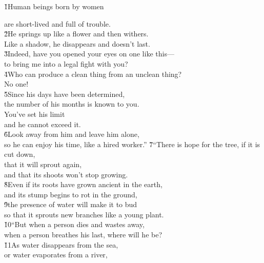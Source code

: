 \v{1}Human beings born by women

\begin{poetry}
\poemll    are short-lived and full of trouble. \\
\poeml \v{2}He springs up like a flower and then withers. \\
\poemll    Like a shadow, he disappears and doesn't last. \\
\poeml \v{3}Indeed, have you opened your eyes on one like this--- \\
\poemll    to bring me into a legal fight with you? \\
\poeml \v{4}Who can produce a clean thing from an unclean thing? \\
\poemll    No one! \\
\poeml \v{5}Since his days have been determined, \\
\poemll    the number of his months is known to you. \\
\poeml You've set his limit \\
\poemll    and he cannot exceed it. \\
\poeml \v{6}Look away from him and leave him alone, \\
\poemll    so he can enjoy his time, like a hired worker.''
\poeml \v{7}``There is hope for the tree, if it is cut down, \\
\poemll    that it will sprout again, \\
\poemlll       and that its shoots won't stop growing. \\
\poeml \v{8}Even if its roots have grown ancient in the earth, \\
\poemll    and its stump begins to rot in the ground, \\
\poeml \v{9}the presence of water will make it to bud \\
\poemll    so that it sprouts new branches like a young plant. \\
\poeml \v{10}``But when a person dies and wastes away, \\
\poemll    when a person breathes his last, where will he be? \\
\poeml \v{11}As water disappears from the sea, \\
\poemll    or water evaporates from a river, \\

\end{poetry}

